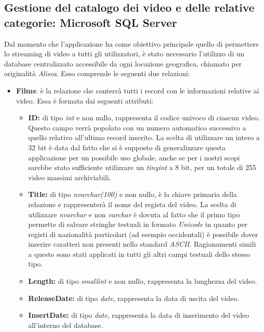 \documentclass[a4]{book}
\begin{document}
\subsection{Gestione del catalogo dei video e delle relative categorie: Microsoft SQL Server}

Dal momento che l'applicazione ha come obiettivo principale quello di permettere lo streaming di video a tutti gli utilizzatori, è stato necessario l'utilizzo di un database centralizzato accessibile da ogni locazione geografica, chiamato per originalità \textit{Alisea}. Esso comprende le seguenti due relazioni:

\begin{itemize}
		\item \textbf{Films}: è la relazione che conterrà tutti i record con le informazioni relative ai video. Essa è formata dai seguenti attributi:
		\begin{itemize}
			\item \textbf{ID:} di tipo \textit{int} e non nullo, rappresenta il codice univoco di ciascun video. Questo campo verrà popolato con un numero automatico successivo a quello relativo all'ultimo record inserito. La scelta di utilizzare un intero a 32 bit è data dal fatto che si è supposto di generalizzare questa applicazione per un possibile uso globale, anche se per i nostri scopi sarebbe stato sufficiente utilizzare un \textit{tinyint} a 8 bit, per un totale di 255 video massimi archiviabili.
			
			\item \textbf{Title: } di tipo \textit{nvarchar(100)} e non nullo, è la chiave primaria della relazione e rappresenterà il nome del regista del video. La scelta di utilizzare \textit{nvarchar} e non \textit{varchar} è dovuta al fatto che il primo tipo permette di salvare stringhe testuali in formato \textit{Unicode} in quanto per registi di nazionalità particolari (ad esempio occidentali) è possibile dover inserire caratteri non presenti nello standard \textit{ASCII}. Ragionamenti simili a questo sono stati applicati in tutti gli altri campi testuali dello stesso tipo.
			
			\item \textbf{Length: } di tipo \textit{smallint} e non nullo, rappresenta la lunghezza del video.
			
			\item \textbf{ReleaseDate: } di tipo \textit{date}, rappresenta la data di uscita del video.
				
			\item \textbf{InsertDate: } di tipo \textit{date}, rappresenta la data di inserimento del video all'interno del database.
			

\end{itemize}
\end{itemize}
\end{document}

